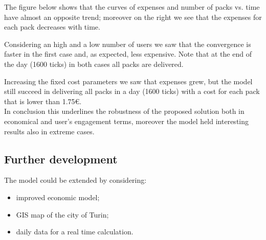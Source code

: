 \documentclass[11pt,a4paper]{article}
\begin{document}
The figure below shows that the curves of expenses and number of packs vs. time have almost an opposite trend; moreover on the right we see that the expenses for each pack decreases with time.

\newpage
Considering an high and a low number of users we saw that the convergence is faster in the first case and, as expected, less expensive. Note that at the end of the day (1600 ticks) in both cases all packs are delivered.


Increasing the fixed cost parameters we saw that expenses grew, but the model still succeed in delivering all packs in a day (1600 ticks) with a cost for each pack that is lower than 1.75\euro{}.
\\
In conclusion this underlines the robustness of the proposed solution both in economical and user's engagement terms, moreover the model held interesting results also in extreme cases.

\subsection*{Further development}
The model could be extended by considering:
\begin{itemize}
\item improved economic model;
\item GIS map of the city of Turin;
\item daily data for a real time calculation.
\end{itemize}
\end{document}
